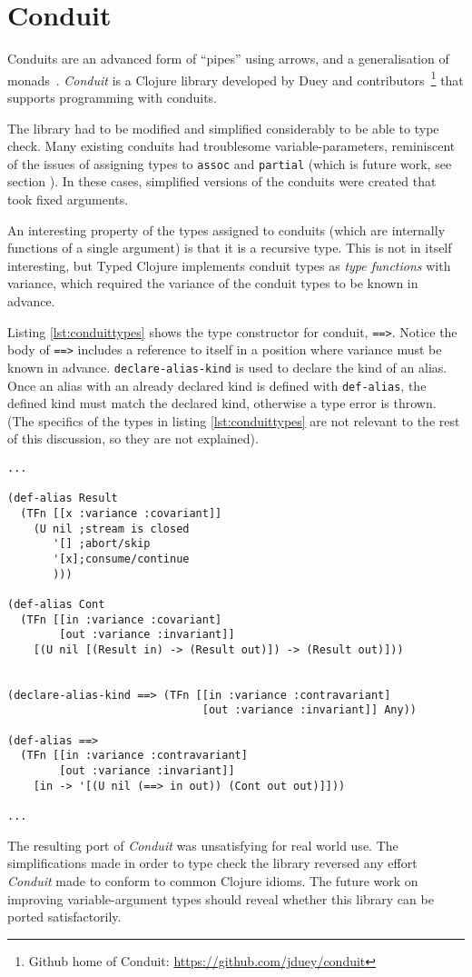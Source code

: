 \section{Conduit}

Conduits are an advanced form of ``pipes'' using arrows, and a generalisation of monads~\cite{ConduitRef}.
\emph{Conduit} is a Clojure library developed by Duey and 
contributors~\footnote{Github home of Conduit: \url{https://github.com/jduey/conduit}} 
that supports programming with conduits.

The library had to be modified and simplified considerably to be able to type check.
Many existing conduits had troublesome variable-parameters, reminiscent of the
issues of assigning types to \lstinline|assoc| and \lstinline|partial|
(which is future work, see section \label{sec:futurearity}).
In these cases, simplified versions of the conduits were created that 
took fixed arguments.

An interesting property of the types assigned to conduits (which
are internally functions of a single argument) is that it is
a recursive type. This is not in itself interesting, but Typed Clojure
implements conduit types as \emph{type functions} with variance,
which required the variance of the conduit types to be known in advance.

Listing \ref{lst:conduittypes} shows the type constructor for conduit,
\lstinline|==>|. Notice the body of \lstinline|==>| includes a reference
to itself in a position where variance must be known in advance.
\lstinline|declare-alias-kind| is used to declare the kind of an alias.
Once an alias with an already declared kind is defined with \lstinline|def-alias|,
the defined kind must match the declared kind, otherwise a type error is thrown.
(The specifics of the types in listing \ref{lst:conduittypes} are not relevant to the rest of this discussion,
so they are not explained).

\begin{lstlisting}[caption=Types for Conduits, label=lst:conduittypes]
...

(def-alias Result
  (TFn [[x :variance :covariant]]
    (U nil ;stream is closed
       '[] ;abort/skip
       '[x];consume/continue
       )))

(def-alias Cont
  (TFn [[in :variance :covariant]
        [out :variance :invariant]]
    [(U nil [(Result in) -> (Result out)]) -> (Result out)]))


(declare-alias-kind ==> (TFn [[in :variance :contravariant]
                              [out :variance :invariant]] Any))

(def-alias ==>
  (TFn [[in :variance :contravariant] 
        [out :variance :invariant]]
    [in -> '[(U nil (==> in out)) (Cont out out)]]))

...
\end{lstlisting}


The resulting port of \emph{Conduit} was unsatisfying for real world use.
The simplifications made in order to type check the library reversed
any effort \emph{Conduit} made to conform to common Clojure idioms.
The future work on improving variable-argument types should reveal whether
this library can be ported satisfactorily.
